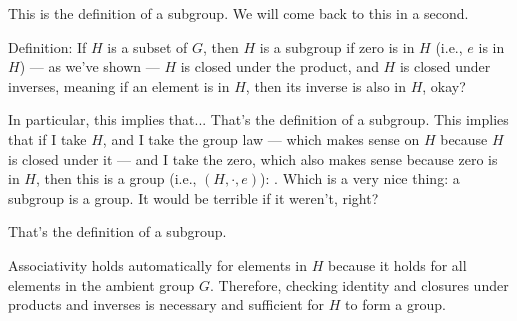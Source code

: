 \begin{speech}[00:25:18 - 00:26:29]
This is the definition of a subgroup. We will come back to this in a second.

Definition:  If $H$ is a subset of $G$,  then $H$ is a subgroup  if zero is in $H$ (i.e., $e$ is in $H$)  --- as we've shown --- $H$ is closed under the product,  and $H$ is closed under inverses,  meaning if an element is in $H$, then its inverse is also in $H$, okay?

In particular, this implies that... That's the definition of a subgroup. This implies that if I take $H$, and I take the group law --- which makes sense on $H$ because $H$ is closed under it --- and I take the zero, which also makes sense because zero is in $H$, then this is a group (i.e., $(H, \cdot, e)$): . Which is a very nice thing: a subgroup is a group. It would be terrible if it weren't, right?

That's the definition of a subgroup.
\end{speech}

\begin{content}

\begin{steps}
Associativity holds automatically for elements in $H$ because it holds for all elements in the ambient group $G$. Therefore, checking identity and closures under products and inverses is necessary and sufficient for $H$ to form a group.
\end{steps}
\end{content}

